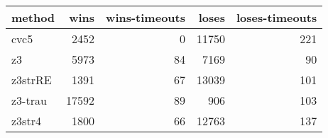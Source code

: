 \begin{tabular}{lrrrr}
\hline
 method   &   wins &   wins-timeouts &   loses &   loses-timeouts \\
\hline
 cvc5     &   2452 &               0 &   11750 &              221 \\
 z3       &   5973 &              84 &    7169 &               90 \\
 z3strRE  &   1391 &              67 &   13039 &              101 \\
 z3-trau  &  17592 &              89 &     906 &              103 \\
 z3str4   &   1800 &              66 &   12763 &              137 \\
\hline
\end{tabular}
